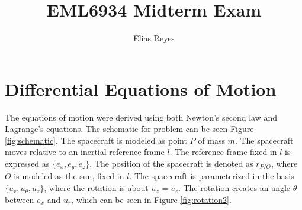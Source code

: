 \documentclass[]{article}
\title{EML6934 Midterm Exam}
\author{Elias Reyes}
\begin{document}
\maketitle

\begin{abstract}

\end{abstract}

\section{Differential Equations of Motion}
The equations of motion were derived using both Newton's second law and Lagrange's equations. The schematic for problem can be seen Figure \ref{fig:schematic}. The spacecraft is modeled as point \(P\) of  mass \(m\). The spacecraft moves relative to an inertial reference frame \(l\). The reference frame fixed in \(l\) is expressed as \(\{e_{x},e_{y},e_{z}\}\). The position of the spacecraft is denoted as \(r_{P/O}\), where \(O\) is modeled as the sun, fixed in \(l\). The spacecraft is parameterized in the basis \(\{u_{r},u_{\theta},u_{z}\}\), where the rotation is about \(u_{z}\) = \(e_{z}\). The rotation creates an angle \(\theta\) between \(e_{x}\) and \(u_{r}\), which can be seen in Figure \ref{fig:rotation2}.
\end{document}
